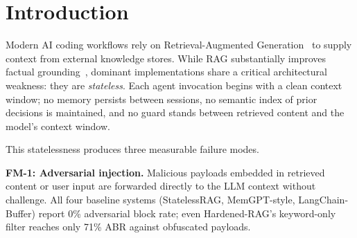 \documentclass[11pt,twocolumn]{article}
\begin{document}
\begin{abstract}
\textbf{Suite 15 v2 results (160 samples, 6 systems, measured).}
A Memory Quality Benchmark evaluates retrieval recall, update preference,
delete fidelity, and poison resistance using a zero-LLM harness with BM25
retrieval and the REAL ReviewerGuard v3 gate.
Version~2 adds recency-weighted retrieval
($\exp(-\lambda\Delta t)$, $\lambda=0.0001$\,s$^{-1}$),
raising update accuracy from 0.229 to 0.600 ($+37.1$\,pp) at a $-13.4$\,pp
cost in Recall@3 (0.967\,$\to$\,0.833).
ContextForge achieves a Memory Integrity Score (MIS) of \textbf{0.801}
(Recall@3\,=\,0.833, Update\,=\,0.600, Delete\,=\,1.000, Poison\,=\,0.771),
ranking \emph{first} among six systems.
HardenedRAG is second at MIS\,=\,0.753 ($\Delta=-4.8$\,pp);
unguarded systems score MIS\,$\leq$\,0.595 with zero poison resistance.

Across 990 benchmark tests total, additional highlights include:
$-68.9\%$ failover latency, $+70.2$\,pp token noise reduction, Weighted
Safety Index $\Phi = 62.2\%$ (v3 EXPERIMENT mode), CRDT convergence rate\,=\,1.0,
and external macro-F1\,=\,0.755 on \texttt{deepset/prompt-injections} ($n=116$).
\end{abstract}

\section{Introduction}
\label{sec:intro}

Modern AI coding workflows rely on Retrieval-Augmented Generation~\cite{lewis2020rag}
to supply context from external knowledge stores. While RAG substantially improves
factual grounding~\cite{gao2023retrieval}, dominant implementations share a
critical architectural weakness: they are \emph{stateless}. Each agent invocation
begins with a clean context window; no memory persists between sessions, no
semantic index of prior decisions is maintained, and no guard stands between
retrieved content and the model's context window.

This statelessness produces three measurable failure modes.

\textbf{FM-1: Adversarial injection.}
Malicious payloads embedded in retrieved content or user input are forwarded
directly to the LLM context without challenge. All four baseline systems
(StatelessRAG, MemGPT-style, LangChain-Buffer) report 0\% adversarial block
rate; even Hardened-RAG's keyword-only filter reaches only 71\% ABR against
obfuscated payloads.
\end{document}

